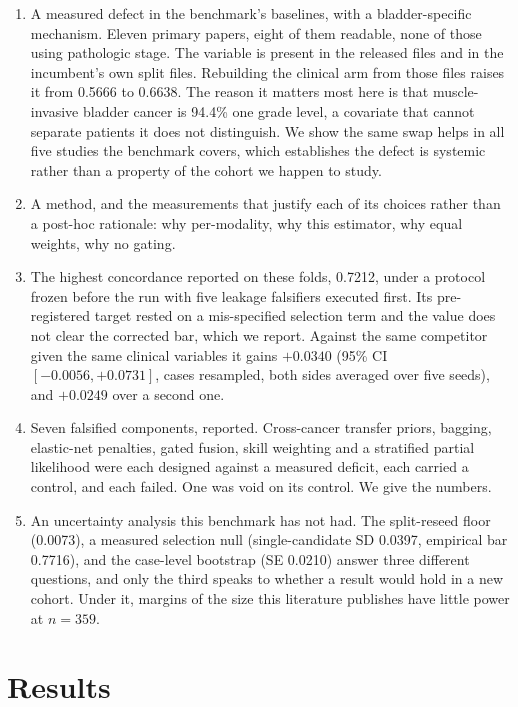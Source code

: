 \documentclass[11pt]{article}
\begin{document}
\begin{enumerate}
  \item A measured defect in the benchmark's baselines, with a bladder-specific
    mechanism. Eleven primary papers, eight of them readable, none of those using pathologic stage. The variable is present in the
    released files and in the incumbent's own split files. Rebuilding the clinical arm from those
    files raises it from 0.5666 to 0.6638. The reason it matters most here is that muscle-invasive
    bladder cancer is 94.4\% one grade level, a covariate that cannot separate patients it does
    not distinguish. We show the same swap helps in all five studies the benchmark covers, which
    establishes the defect is systemic rather than a property of the cohort we happen to study.
  \item A method, and the measurements that justify each of its choices rather than a
    post-hoc rationale: why per-modality, why this estimator, why equal weights, why no gating.
  \item The highest concordance reported on these folds, 0.7212, under a protocol frozen before
    the run with five leakage falsifiers executed first. Its pre-registered target rested on a
    mis-specified selection term and the value does not clear the corrected bar, which we
    report. Against the same competitor given the same clinical variables it gains $+0.0340$
    (95\% CI $[-0.0056,+0.0731]$, cases resampled, both sides averaged over five seeds), and
    $+0.0249$ over a second one.
  \item Seven falsified components, reported. Cross-cancer transfer priors, bagging,
    elastic-net penalties, gated fusion, skill weighting and a stratified partial likelihood were
    each designed against a measured deficit, each carried a control, and each failed. One was void
    on its control. We give the numbers.
  \item An uncertainty analysis this benchmark has not had. The split-reseed floor (0.0073), a
    measured selection null (single-candidate SD 0.0397, empirical bar 0.7716), and the
    case-level bootstrap (SE 0.0210) answer three different questions, and only the third
    speaks to whether a result would hold in a new cohort. Under it, margins of the size this
    literature publishes have little power at $n=359$.
\end{enumerate}

\section{Results}
\end{document}
